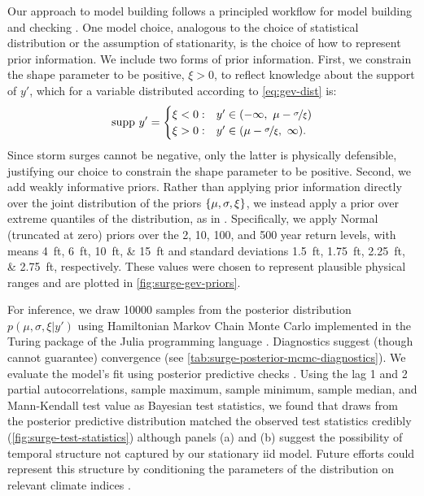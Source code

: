 \documentclass[11pt]{article}
\begin{document}
Our approach to model building follows a principled workflow for model building and checking \citep[see][for details]{gelman_workflow:2020}.
One model choice, analogous to the choice of statistical distribution or the assumption of stationarity, is the choice of how to represent prior information.
We include two forms of prior information.
First, we constrain the shape parameter to be positive, $\xi > 0$, to reflect knowledge about the support of $y'$, which for a variable distributed according to \cref{eq:gev-dist} is:
\begin{equation*}
    \mathrm{supp}~ y' =
    \begin{cases}
        \xi < 0: & y' \in \qty(-\infty,~ \mu - \nicefrac{\sigma}{\xi}) \\
        \xi > 0: & y' \in \qty(\mu-\nicefrac{\sigma}{\xi},~ \infty).
    \end{cases}
\end{equation*}
Since storm surges cannot be negative, only the latter is physically defensible, justifying our choice to constrain the shape parameter to be positive.
Second, we add weakly informative priors.
Rather than applying prior information directly over the joint distribution of the priors $\qty{\mu,\sigma,\xi}$, we instead apply a prior over extreme quantiles of the distribution, as in \citet{coles_evd:1996}.
Specifically, we apply Normal (truncated at zero) priors over the 2, 10, 100, and 500 year return levels, with means \SIlist{4;6;10;15}{ft} and standard deviations \SIlist{1.5;1.75;2.25;2.75}{ft}, respectively.
These values were chosen to represent plausible physical ranges and are plotted in \cref{fig:surge-gev-priors}.

For inference, we draw \num{10000} samples from the posterior distribution $p(\mu,\sigma,\xi | y')$ using Hamiltonian Markov Chain Monte Carlo \citep{Betancourt:2017vd,hoffman_nuts:2011} implemented in the Turing package of the Julia programming language \citep{perkel_julia:2019,ge_turing:2018,tarek_dynamicppl:2020,besancon_distributions.jl:2021,bezanson_julia:2012}.
Diagnostics suggest (though cannot guarantee) convergence (see \cref{tab:surge-posterior-mcmc-diagnostics}).
We evaluate the model's fit using posterior predictive checks \citep[see][section 2.4 and references therein]{gelman_workflow:2020}.
Using the lag 1 and 2 partial autocorrelations, sample maximum, sample minimum, sample median, and Mann-Kendall test value as Bayesian test statistics, we found that draws from the posterior predictive distribution matched the observed test statistics credibly (\cref{fig:surge-test-statistics}) although panels (a) and (b) suggest the possibility of temporal structure not captured by our stationary \gls{iid} model.
Future efforts could represent this structure by conditioning the parameters of the distribution on relevant climate indices \citep[as in][]{wong_structural:2020,Farnham:2016tw,farnham_jetstream:2017}.
\end{document}
